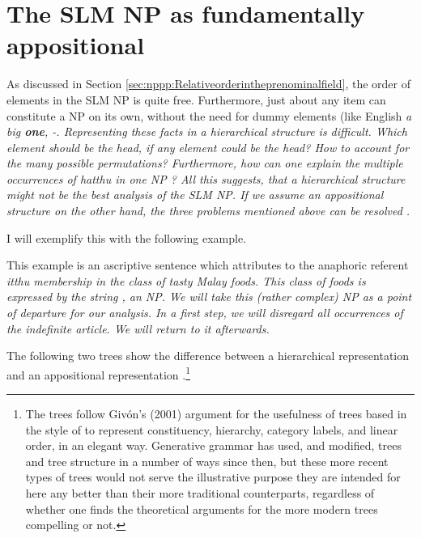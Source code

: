 \section{The SLM NP as fundamentally appositional}\label{sec:nppp:TheSLMNPasappositional}
As discussed in Section \ref{sec:nppp:Relativeorderintheprenominalfield}, the order of elements in the SLM NP is quite free. Furthermore, just about any item can constitute a NP on its own, without the need for dummy elements (like English \em a big \textbf{one}\em, -. Representing these facts in a hierarchical structure is difficult. Which element should be the head, if any element could be the head? How to account for the many possible permutations? Furthermore, how can one explain the multiple occurrences of \em hatthu \em in one NP ? All this suggests, that a hierarchical structure might not be the best analysis of the SLM NP. If we assume an appositional structure on the other hand, the three problems mentioned above can be resolved \citep[cf.][275]{Rijkhoff2002}.

I will exemplify this with the following example.



This example is an ascriptive sentence which attributes to the anaphoric referent \em itthu \em membership in the class of tasty Malay foods. This class of foods is expressed by the string , an NP. We will take this (rather complex) NP as a point of departure for our analysis. In a first step, we will disregard all occurrences of the indefinite article. We will return to it afterwards.


The following two trees show the difference between a hierarchical representation  and an appositional representation .\footnote{The trees follow Givón's (2001) \nocite{Givon2001a,Givon2001b} argument for the usefulness of trees based in the style of \citet{Chomsky1957,Chomsky1965} to represent constituency, hierarchy, category labels, and linear order, in an elegant way. Generative grammar has used, and modified, trees and tree structure in a number of ways since then, but these more recent types of trees would not serve the illustrative purpose they are intended for here any better than their more traditional counterparts, regardless of whether one finds the theoretical arguments for the more modern trees compelling or not.}


